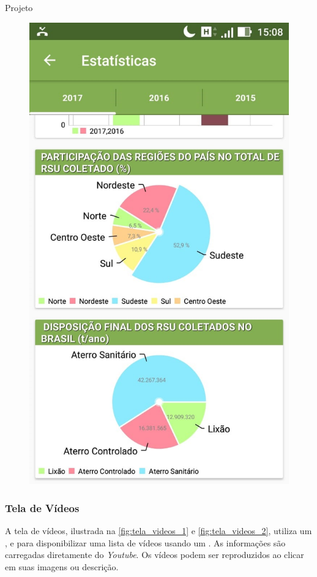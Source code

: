\documentclass[
	12pt,				%
	openany,			%
	twoside,			%
	a4paper,			%
	english,			%
	french,				%
	spanish,			%
	brazil				%
	]{abntex2}
\begin{document}
\begin{chapter}{Projeto}
\begin{figure}[htb]
\begin{minipage}{0.45\textwidth}
    \includegraphics[scale=0.35]{media/tela_stats_2.jpg}
     \label{fig:tela_stats_2}
  \end{minipage}
\end{figure}

\newpage
\subsubsection{Tela de Vídeos}
A tela de vídeos, ilustrada na \autoref{fig:tela_videos_1} e \autoref{fig:tela_videos_2}, utiliza um ,  e  para disponibilizar uma lista de vídeos usando um . As informações são carregadas diretamente do \textit{Youtube}. Os vídeos podem ser reproduzidos ao clicar em suas imagens ou descrição.


\end{chapter}
\end{document}
